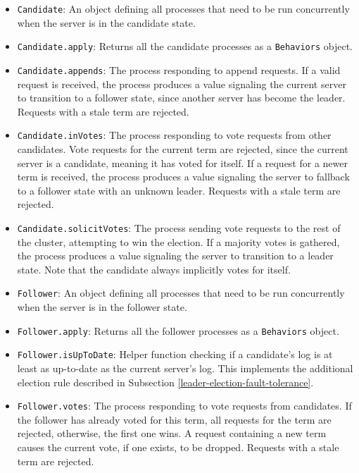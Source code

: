 \begin{itemize}
    \item \lstinline|Candidate|: An object defining all processes that need to be run concurrently when the server is in the candidate state.
    \item \lstinline|Candidate.apply|: Returns all the candidate processes as a \lstinline|Behaviors| object.
    \item \lstinline|Candidate.appends|: The process responding to append requests. If a valid request is received, the process produces a value signaling the current server to transition to a follower state, since another server has become the leader. Requests with a stale term are rejected.
    \item \lstinline|Candidate.inVotes|: The process responding to vote requests from other candidates. Vote requests for the current term are rejected, since the current server is a candidate, meaning it has voted for itself. If a request for a newer term is received, the process produces a value signaling the server to fallback to a follower state with an unknown leader. Requests with a stale term are rejected.
    \item \lstinline|Candidate.solicitVotes|: The process sending vote requests to the rest of the cluster, attempting to win the election. If a majority votes is gathered, the process produces a value signaling the server to transition to a leader state. Note that the candidate always implicitly votes for itself.
    \item \lstinline|Follower|: An object defining all processes that need to be run concurrently when the server is in the follower state.
    \item \lstinline|Follower.apply|: Returns all the follower processes as a \lstinline|Behaviors| object.
    \item \lstinline|Follower.isUpToDate|: Helper function checking if a candidate's log is at least as up-to-date as the current server's log. This implements the additional election rule described in Subsection \ref{leader-election-fault-tolerance}.
    \item \lstinline|Follower.votes|: The process responding to vote requests from candidates. If the follower has already voted for this term, all requests for the term are rejected, otherwise, the first one wins. A request containing a new term causes the current vote, if one exists, to be dropped. Requests with a stale term are rejected.

\end{itemize}
